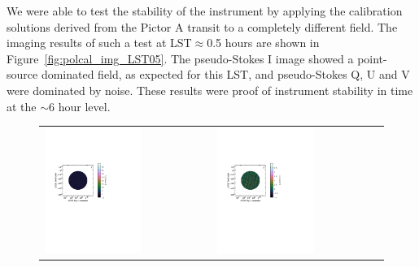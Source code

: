We were able to test the stability of the instrument by applying the calibration solutions derived from the Pictor A transit to a completely different field. The imaging results of such a test at LST$\approx$0.5 hours are shown in Figure~\ref{fig:polcal_img_LST05}. The pseudo-Stokes I image showed a point-source dominated field, as expected for this LST, and pseudo-Stokes Q, U and V were dominated by noise. These results were proof of instrument stability in time at the $\sim$6 hour level.

\begin{figure}
\hspace{-2cm}\begin{tabular}{ll}
\includegraphics[clip, trim=0.1cm 11cm 6cm 6cm, width=0.6\textwidth]{chapters/polcal/figures/47501-I-improved.pdf} &
\includegraphics[clip, trim=0.1cm 11cm 6cm 6cm, width=0.6\textwidth]{chapters/polcal/figures/47501-Q-improved.pdf} \\

\end{tabular}
\end{figure}
